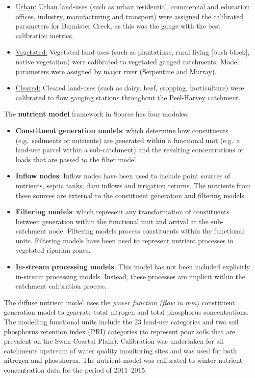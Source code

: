 \documentclass[
]{book}
\begin{document}
\begin{itemize}
\item
  \underline{Urban:} Urban land-uses (such as urban residential, commercial and education offices, industry, manufacturing and transport) were assigned the calibrated parameters for Bannister Creek, as this was the gauge with the best calibration metrics.~
\item
  \underline{Vegetated:} Vegetated land-uses (such as plantations, rural living {[}bush block{]}, native vegetation) were calibrated to vegetated gauged catchments. Model parameters were assigned by major river (Serpentine and Murray).~
\item
  \underline{Cleared:} Cleared land-uses (such as dairy, beef, cropping, horticulture) were calibrated to flow gauging stations throughout the Peel-Harvey catchment.~
\end{itemize}

The \textbf{nutrient model} framework in Source has four modules:

\begin{itemize}
\item
  \textbf{Constituent generation models}: which determine how constituents (e.g.~sediments or nutrients) are generated within a functional unit (e.g.~a land-use parcel within a sub-catchment) and the resulting concentrations or loads that are passed to the filter model.~
\item
  \textbf{Inflow nodes}: Inflow nodes have been used to include point sources of nutrients, septic tanks, dam inflows and irrigation returns. The nutrients from these sources are external to the constituent generation and filtering models.
\item
  \textbf{Filtering models}: which represent any transformation of constituents between generation within the functional unit and arrival at the sub-catchment node. Filtering models process constituents within the functional units. Filtering models have been used to represent nutrient processes in vegetated riparian zones.
\item
  \textbf{In-stream processing models}: This model has not been included explicitly in-stream processing models. Instead, these processes are implicit within the catchment calibration process.
\end{itemize}

The diffuse nutrient model uses the \emph{power function (flow in mm)} constituent generation model to generate total nitrogen and total phosphorus concentrations. The modelling functional units include the 23 land-use categories and two soil phosphorus retention index (PRI) categories (to represent poor soils that are prevalent on the Swan Coastal Plain). Calibration was undertaken for all catchments upstream of water quality monitoring sites and was used for both nitrogen and phosphorus. The nutrient model was calibrated to winter nutrient concentration data for the period of 2011--2015.
\end{document}
